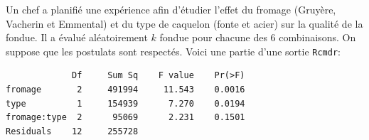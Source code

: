 \begin{questions}

\newpage

\question\label{2F} 

Un chef a planifié une expérience afin d'étudier l'effet du fromage (Gruyère, Vacherin et Emmental) et du type de caquelon (fonte et acier) sur la qualité de la fondue. Il a évalué aléatoirement $k$ fondue pour chacune des 6 combinaisons. On suppose que les postulats sont respectés. Voici une partie d'une sortie \texttt{Rcmdr}:
\begin{verbatim}
             Df     Sum Sq    F value    Pr(>F)   
fromage       2     491994     11.543    0.0016 
type          1     154939      7.270    0.0194  
fromage:type  2      95069      2.231    0.1501   
Residuals    12     255728  
\end{verbatim}
\begin{parts}

\end{parts}
\end{questions}
